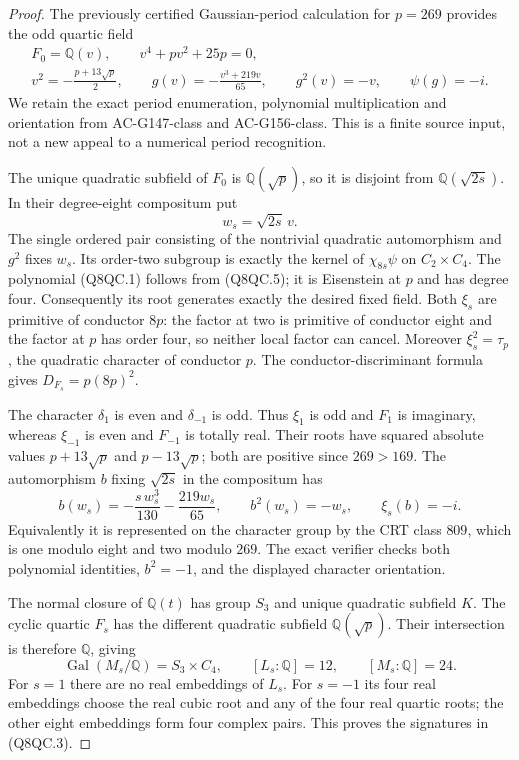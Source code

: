 \begin{proof}
The previously certified Gaussian-period calculation for $p=269$
provides the odd quartic field
\[
 \begin{gathered}
 F_0=\mathbb Q(v),\qquad v^4+pv^2+25p=0,\\
 v^2=-\frac{p+13\sqrt p}{2},\qquad
 g(v)=-\frac{v^3+219v}{65},\qquad
 g^2(v)=-v,\qquad\psi(g)=-i .
 \end{gathered}
 \tag{Q8QC.5}
\]
We retain the exact period enumeration, polynomial multiplication
and orientation from AC-G147-class and AC-G156-class.
This is a finite source input, not a new appeal to a numerical
period recognition.

The unique quadratic subfield of $F_0$ is $\mathbb Q(\sqrt p)$,
so it is disjoint from $\mathbb Q(\sqrt{2s})$.
In their degree-eight compositum put
\[
                         w_s=\sqrt{2s}\,v .
 \tag{Q8QC.6}
\]
The single ordered pair consisting of the nontrivial quadratic
automorphism and $g^2$ fixes $w_s$.
Its order-two subgroup is exactly the kernel of
$\chi_{8s}\psi$ on $C_2\times C_4$.
The polynomial (Q8QC.1) follows from (Q8QC.5);
it is Eisenstein at $p$ and has degree four.
Consequently its root generates exactly the desired fixed field.
Both $\xi_s$ are primitive of conductor $8p$: the factor at two
is primitive of conductor eight and the factor at $p$ has order
four, so neither local factor can cancel.
Moreover $\xi_s^2=\tau_p$, the quadratic character of conductor $p$.
The conductor-discriminant formula gives
$D_{F_s}=p(8p)^2$.

The character $\delta_1$ is even and $\delta_{-1}$ is odd.
Thus $\xi_1$ is odd and $F_1$ is imaginary, whereas $\xi_{-1}$
is even and $F_{-1}$ is totally real.
Their roots have squared absolute values
$p+13\sqrt p$ and $p-13\sqrt p$; both are positive since
$269>169$.
The automorphism $b$ fixing $\sqrt{2s}$ in the compositum has
\[
 b(w_s)=-\frac{s\,w_s^3}{130}-\frac{219w_s}{65},
 \qquad b^2(w_s)=-w_s,\qquad \xi_s(b)=-i .
 \tag{Q8QC.7}
\]
Equivalently it is represented on the character group by the
CRT class $809$, which is one modulo eight and two modulo $269$.
The exact verifier checks both polynomial identities, $b^2=-1$,
and the displayed character orientation.

The normal closure of $\mathbb Q(t)$ has group $S_3$ and unique
quadratic subfield $K$.
The cyclic quartic $F_s$ has the different quadratic subfield
$\mathbb Q(\sqrt p)$.
Their intersection is therefore $\mathbb Q$, giving
\[
 \operatorname{Gal}(M_s/\mathbb Q)=S_3\times C_4,\qquad
 [L_s:\mathbb Q]=12,\qquad[M_s:\mathbb Q]=24.
 \tag{Q8QC.8}
\]
For $s=1$ there are no real embeddings of $L_s$.
For $s=-1$ its four real embeddings choose the real cubic root
and any of the four real quartic roots; the other eight
embeddings form four complex pairs.
This proves the signatures in (Q8QC.3).


\end{proof}
